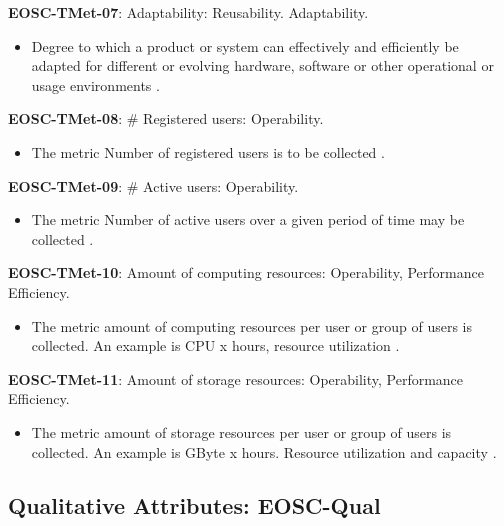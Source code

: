 \textbf{EOSC-TMet-07}: Adaptability: Reusability. Adaptability.

\begin{itemize}
    \item Degree to which a product or system can effectively and efficiently be adapted for different or evolving hardware, software or other operational or usage environments \cite{iso_25010_2011_2017,gillies_modelling_1992,boehm_quantitative_1976}.
\end{itemize}

\textbf{EOSC-TMet-08}: \# Registered users: Operability.

\begin{itemize}
    \item The metric Number of registered users is to be collected \cite{orviz_fernandez_eosc-synergy_2020}.
\end{itemize}

\textbf{EOSC-TMet-09}: \# Active users: Operability.

\begin{itemize}
    \item The metric Number of active users over a given period of time may be collected \cite{orviz_fernandez_eosc-synergy_2020}.
\end{itemize}

\textbf{EOSC-TMet-10}: Amount of computing resources: Operability, Performance Efficiency.

\begin{itemize}
    \item The metric amount of computing resources per user or group of users is collected. An example is CPU x hours, resource utilization \cite{iso_25010_2011_2017,orviz_fernandez_eosc-synergy_2020}.
\end{itemize}

\textbf{EOSC-TMet-11}: Amount of storage resources: Operability, Performance Efficiency.

\begin{itemize}
    \item The metric amount of storage resources per user or group of users is collected. An example is GByte x hours. Resource utilization and capacity \cite{iso_25010_2011_2017,orviz_fernandez_eosc-synergy_2020}.
\end{itemize}

\subsection{Qualitative Attributes: EOSC-Qual}

